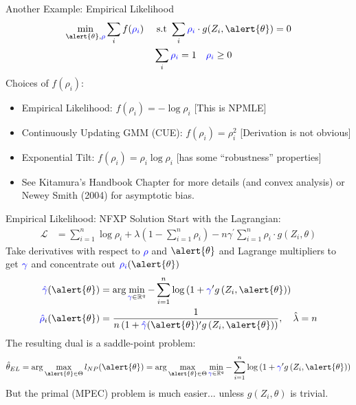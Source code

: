 \begin{frame}{Another Example: Empirical Likelihood}
\begin{align*}
\min_{\alert{\theta}, \textcolor{blue}{\rho} }\sum_i f(\textcolor{blue}{\rho_i}) \quad &\text{ s.t } \sum_i \textcolor{blue}{\rho_i} \cdot g(Z_i,\alert{\theta})= 0\\
& \sum_i \textcolor{blue}{\rho_i} =1 \quad \textcolor{blue}{\rho_i} \geq 0
\end{align*}
Choices of $f(\rho_i)$:
\begin{itemize}
\item Empirical Likelihood: $f(\rho_i) = - \log \rho_i$ [This is NPMLE]
\item Continuously Updating GMM (CUE): $f(\rho_i) = \rho_i^2$ [Derivation is \alert{not} obvious]
\item Exponential Tilt: $f(\rho_i) = \rho_i \log \rho_i $ [has some ``robustness'' properties]
\item See Kitamura's Handbook Chapter for more details (and convex analysis) or Newey Smith (2004) for asymptotic bias.
\end{itemize}
\end{frame}


\begin{frame}{Empirical Likelihood: NFXP Solution}
Start with the Lagrangian:
\begin{align*}
\mathcal{L} &=\sum_{i=1}^{n} \log \rho_{i}+\lambda\left(1-\sum_{i=1}^{n} \rho_{i}\right)-n \gamma^{\prime} \sum_{i=1}^{n} \rho_{i}\cdot g\left(Z_{i}, \theta\right)
\end{align*}
Take derivatives with respect to \textcolor{blue}{$\rho$} and $\alert{\theta}$ and Lagrange multipliers to get $\textcolor{blue}{\gamma}$ and concentrate out $\textcolor{blue}{\rho_i}(\alert{\theta})$
\begin{align*}
\textcolor{blue}{\hat{\gamma}}(\alert{\theta}) &=\arg \min _{\textcolor{blue}{\gamma} \in \mathbb{R}^{q}}-
\sum_{i=1}^{n} \log \left(1+\textcolor{blue}{\gamma}^{\prime} g\left(Z_{i}, \alert{\theta}\right)\right) \\
\textcolor{blue}{\hat{\rho}}_{i}(\alert{\theta}) &=\frac{1}{n\left(1+\textcolor{blue}{\hat{\gamma}}(\alert{\theta})^{\prime} g\left(Z_{i}, \alert{\theta}\right)\right)}, \quad \hat{\lambda}=n
\end{align*}
The resulting dual is a saddle-point problem:
\begin{align*}
\hat{\theta}_{E L}=\arg \max _{\alert{\theta} \in \Theta} l_{N P}(\alert{\theta})=\arg \max _{\alert{\theta} \in \Theta} \min _{\textcolor{blue}{\gamma} \in \mathbb{R}^{q}}-\sum_{i=1}^{n} \log \left(1+\textcolor{blue}{\gamma}^{\prime} g\left(Z_{i}, \alert{\theta}\right)\right)
\end{align*}
But the primal (MPEC) problem is much easier... unless $g(Z_i,\theta)$ is trivial.
\end{frame}





